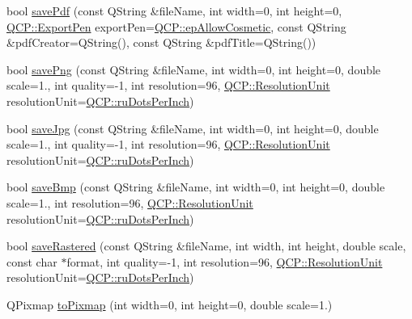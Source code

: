 \begin{DoxyCompactItemize}
\item 
bool \hyperlink{class_q_custom_plot_ad5acd34f6b39c3516887d7e54fec2412}{save\+Pdf} (const Q\+String \&file\+Name, int width=0, int height=0, \hyperlink{namespace_q_c_p_a17844f19e1019693a953e1eb93536d2f}{Q\+C\+P\+::\+Export\+Pen} export\+Pen=\hyperlink{namespace_q_c_p_a17844f19e1019693a953e1eb93536d2fa34716c7388ad3a2ff3ac27e57fb83a5b}{Q\+C\+P\+::ep\+Allow\+Cosmetic}, const Q\+String \&pdf\+Creator=Q\+String(), const Q\+String \&pdf\+Title=Q\+String())
\item 
bool \hyperlink{class_q_custom_plot_ac92cc9256d12f354b40a4be4600b5fb9}{save\+Png} (const Q\+String \&file\+Name, int width=0, int height=0, double scale=1., int quality=-\/1, int resolution=96, \hyperlink{namespace_q_c_p_a715d46153da230990aa887d0f0602452}{Q\+C\+P\+::\+Resolution\+Unit} resolution\+Unit=\hyperlink{namespace_q_c_p_a715d46153da230990aa887d0f0602452a9def6fd83de9b4108ad999541a42ac6a}{Q\+C\+P\+::ru\+Dots\+Per\+Inch})
\item 
bool \hyperlink{class_q_custom_plot_a76f0d278e630a711fa6f48048cfd83e4}{save\+Jpg} (const Q\+String \&file\+Name, int width=0, int height=0, double scale=1., int quality=-\/1, int resolution=96, \hyperlink{namespace_q_c_p_a715d46153da230990aa887d0f0602452}{Q\+C\+P\+::\+Resolution\+Unit} resolution\+Unit=\hyperlink{namespace_q_c_p_a715d46153da230990aa887d0f0602452a9def6fd83de9b4108ad999541a42ac6a}{Q\+C\+P\+::ru\+Dots\+Per\+Inch})
\item 
bool \hyperlink{class_q_custom_plot_ae3a86ed0795670e50afa21759d4fa13d}{save\+Bmp} (const Q\+String \&file\+Name, int width=0, int height=0, double scale=1., int resolution=96, \hyperlink{namespace_q_c_p_a715d46153da230990aa887d0f0602452}{Q\+C\+P\+::\+Resolution\+Unit} resolution\+Unit=\hyperlink{namespace_q_c_p_a715d46153da230990aa887d0f0602452a9def6fd83de9b4108ad999541a42ac6a}{Q\+C\+P\+::ru\+Dots\+Per\+Inch})
\item 
bool \hyperlink{class_q_custom_plot_ad7723ce2edfa270632ef42b03a444352}{save\+Rastered} (const Q\+String \&file\+Name, int width, int height, double scale, const char $\ast$format, int quality=-\/1, int resolution=96, \hyperlink{namespace_q_c_p_a715d46153da230990aa887d0f0602452}{Q\+C\+P\+::\+Resolution\+Unit} resolution\+Unit=\hyperlink{namespace_q_c_p_a715d46153da230990aa887d0f0602452a9def6fd83de9b4108ad999541a42ac6a}{Q\+C\+P\+::ru\+Dots\+Per\+Inch})
\item 
Q\+Pixmap \hyperlink{class_q_custom_plot_aabb974d71ce96c137dc04eb6eab844fe}{to\+Pixmap} (int width=0, int height=0, double scale=1.)

\end{DoxyCompactItemize}
